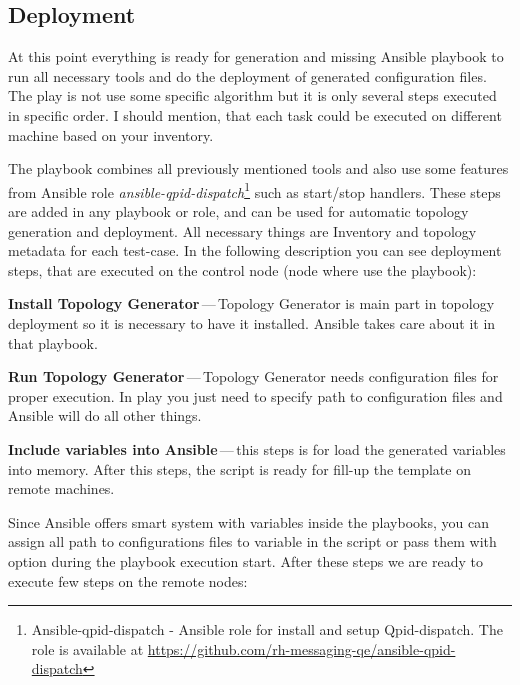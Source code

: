 \subsection{Deployment}
At this point everything is ready for generation and missing Ansible playbook to run all necessary tools and do the deployment of generated configuration files. The play is not use some specific algorithm but it is only several steps executed in specific order. I should mention, that each task could be executed on different machine based on your inventory.

The playbook combines all previously mentioned tools and also use some features from Ansible role \emph{ansible-qpid-dispatch}\footnote{Ansible-qpid-dispatch - Ansible role for install
and setup Qpid-dispatch. The role is available at \url{https://github.com/rh-messaging-qe/ansible-qpid-dispatch}} such as start/stop handlers. These steps are added in any playbook or role, and can be used for automatic topology generation and deployment. All necessary things are Inventory and topology metadata for each test-case. In the following description you can see deployment steps, that are executed on the control node (node where use the playbook):

\begin{description}
	\item \textbf{Install Topology Generator}\,---\,Topology Generator is main part in topology deployment so it is necessary to have it installed. Ansible takes care about it in that playbook.
	\item \textbf{Run Topology Generator}\,---\,Topology Generator needs configuration files for proper execution. In play you just need to specify path to configuration files and Ansible will do all other things.
	\item \textbf{Include variables into Ansible}\,---\,this steps is for load the generated variables into memory. After this steps, the script is ready for fill-up the template on remote machines.
\end{description}

Since Ansible offers smart system with variables inside the playbooks, you can assign all path to configurations files to variable in the script or pass them with option during the playbook execution start. After these steps we are ready to execute few steps on the remote nodes:

